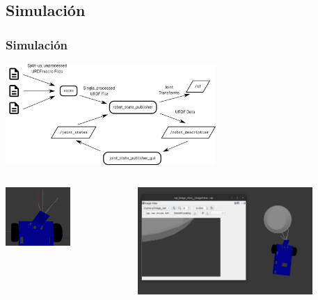 \documentclass{beamer}
\begin{document}
\subsection{Simulación}
\begin{frame}
	\frametitle{Simulación}
	\begin{center}
		\includegraphics[width=0.6\textwidth]{figs/rsp.png} 
	\end{center}
	
	\vspace{0.5cm}  %
	
	\begin{center}
		\begin{columns}
			\begin{column}{0.5\textwidth}
				\centering
				\includegraphics[width=0.55\textwidth]{figs/rotder.png}
			\end{column}
			\begin{column}{0.5\textwidth}
				\centering
				\includegraphics[width=0.8\textwidth]{figs/rqtimage.png}
			\end{column}
		\end{columns}
	\end{center}
\end{frame}
\end{document}
